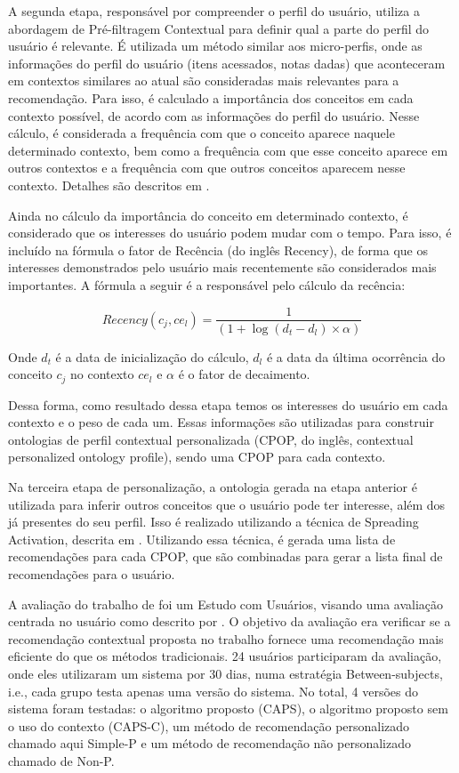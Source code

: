 A segunda etapa, responsável por compreender o perfil do usuário, utiliza a abordagem de Pré-filtragem Contextual para
definir qual a parte do perfil do usuário é relevante. É utilizada um método similar aos micro-perfis, onde as
informações do perfil do usuário (itens acessados, notas dadas) que aconteceram em contextos similares ao atual são
consideradas mais relevantes para a recomendação. Para isso, é calculado a importância dos conceitos em cada contexto
possível, de acordo com as informações do perfil do usuário. Nesse cálculo, é considerada a frequência com que o
conceito aparece naquele determinado contexto, bem como a frequência com que esse conceito aparece em outros contextos
e a frequência com que outros conceitos aparecem nesse contexto. Detalhes são descritos em \cite{hawalah2014utilizing}.

Ainda no cálculo da importância do conceito em determinado contexto, é considerado que os interesses do usuário podem
mudar com o tempo. Para isso, é incluído na fórmula o fator de Recência (do inglês Recency), de forma que os interesses
demonstrados pelo usuário mais recentemente são considerados mais importantes. A fórmula a seguir é a responsável pelo
cálculo da recência:

\begin{equation}
  Recency(c_j, ce_l) = \frac{1}{(1+\log(d_t - d_l) \times \alpha)}
  \label{eq:hawalah-recencia}
\end{equation}

Onde $d_t$ é a data de inicialização do cálculo, $d_l$ é a data da última ocorrência do conceito $c_j$ no contexto
$ce_l$ e $\alpha$ é o fator de decaimento.

Dessa forma, como resultado dessa etapa temos os interesses do usuário em cada contexto e o peso de cada um. Essas
informações são utilizadas para construir ontologias de perfil contextual personalizada (CPOP, do inglês, contextual
personalized ontology profile), sendo uma CPOP para cada contexto.

Na terceira etapa de personalização, a ontologia gerada na etapa anterior é utilizada para inferir outros conceitos que
o usuário pode ter interesse, além dos já presentes do seu perfil. Isso é realizado utilizando a técnica de Spreading
Activation, descrita em . Utilizando essa técnica, é gerada uma lista de recomendações
para cada CPOP, que são combinadas para gerar a lista final de recomendações para o usuário.

A avaliação do trabalho de  foi um Estudo com Usuários, visando uma avaliação centrada
no usuário como descrito por . O objetivo da avaliação era verificar se a recomendação
contextual proposta no trabalho fornece uma recomendação mais eficiente do que os métodos tradicionais. 24 usuários
participaram da avaliação, onde eles utilizaram um sistema por 30 dias, numa estratégia Between-subjects, i.e., cada
grupo testa apenas uma versão do sistema. No total, 4 versões do sistema foram testadas: o algoritmo proposto (CAPS), o
algoritmo proposto sem o uso do contexto (CAPS-C), um método de recomendação personalizado chamado aqui Simple-P e um
método de recomendação não personalizado chamado de Non-P.

